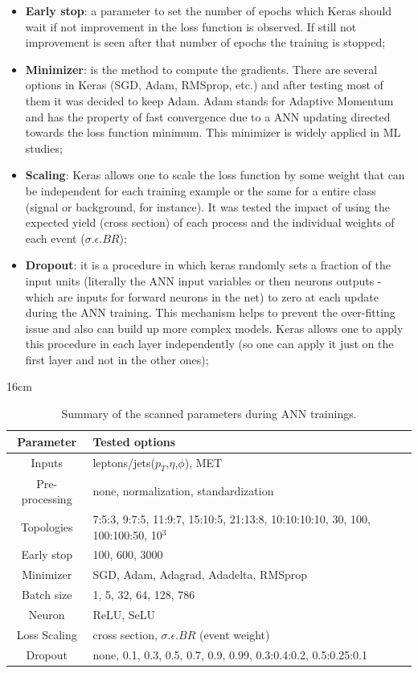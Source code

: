 \begin{itemize}
	\item \textbf{Early stop}: a parameter to set the number of epochs which Keras should wait if not improvement in the loss function is observed. If still not improvement is seen after that number of epochs the training is stopped;
	\item \textbf{Minimizer}: is the method to compute the gradients. There are several options in Keras (SGD, Adam, RMSprop, etc.) and after testing most of them it was decided to keep Adam. Adam stands for Adaptive Momentum and has the property of fast convergence due to a ANN updating directed towards the loss function minimum. This minimizer is widely applied in ML studies;
	\item \textbf{Scaling}: Keras allows one to scale the loss function by some weight that can be independent for each training example or the same for a entire class (signal or background, for instance). It was tested the impact of using the expected yield (cross section) of each process and the individual weights of each event ($\sigma.\epsilon.BR$);
	\item \textbf{Dropout}: it is a procedure in which keras randomly sets a fraction of the input units (literally the ANN input variables or then neurons outputs - which are inputs for forward neurons in the net) to zero at each update during the ANN training. This mechanism helps to prevent the over-fitting issue and also can build up more complex models. Keras allows one to apply this procedure in each layer independently (so one can apply it just on the first layer and not in the other ones);
\end{itemize}

\begin{table}[hbtp]{16cm}
	\centering
	\caption{Summary of the scanned parameters during ANN trainings.}
	\begin{tabular}{c|l}
		\hline
		\rowcolor{light_gray}
		Parameter      & Tested options\\
		\hline
		Inputs         & leptons/jets($p_{T}$,$\eta$,$\phi$), MET\\
		\hline
		Pre-processing & none, normalization, standardization\\
		\hline
		Topologies     & 7:5:3, 9:7:5, 11:9:7, 15:10:5, 21:13:8, 10:10:10:10, 30, 100, 100:100:50, 10$^{3}$\\
		\hline
		Early stop     & 100, 600, 3000\\
		\hline
		Minimizer      & SGD, Adam, Adagrad, Adadelta, RMSprop\\
		\hline
		Batch size     & 1, 5, 32, 64, 128, 786\\
		\hline
		Neuron         & ReLU, SeLU\\
		\hline
		Loss Scaling   & cross section, $\sigma.\epsilon.BR$ (event weight)\\
		\hline
		Dropout        & none, 0.1, 0.3, 0.5, 0.7, 0.9, 0.99, 0.3:0.4:0.2, 0.5:0.25:0.1\\
		\hline
	\end{tabular}
	\label{tab:training_parameters_summary}	
\end{table}

